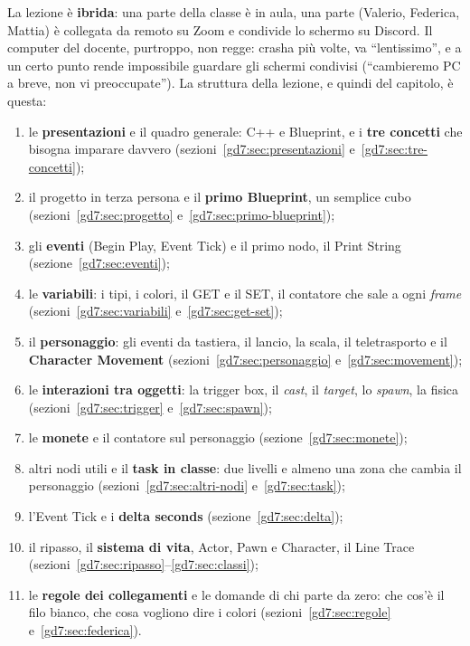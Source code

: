 La lezione è \textbf{ibrida}: una parte della classe è in aula, una parte
(Valerio, Federica, Mattia) è collegata da remoto su Zoom e condivide lo
schermo su Discord. Il computer del docente, purtroppo, non regge: crasha più
volte, va ``lentissimo'', e a un certo punto rende impossibile guardare gli
schermi condivisi (``cambieremo PC a breve, non vi preoccupate''). La
struttura della lezione, e quindi del capitolo, è questa:
\begin{enumerate}
  \item le \textbf{presentazioni} e il quadro generale: C++ e Blueprint, e i
        \textbf{tre concetti} che bisogna imparare davvero
        (sezioni~\ref{gd7:sec:presentazioni} e~\ref{gd7:sec:tre-concetti});
  \item il progetto in terza persona e il \textbf{primo Blueprint}, un
        semplice cubo (sezioni~\ref{gd7:sec:progetto}
        e~\ref{gd7:sec:primo-blueprint});
  \item gli \textbf{eventi} (Begin Play, Event Tick) e il primo nodo, il
        Print String (sezione~\ref{gd7:sec:eventi});
  \item le \textbf{variabili}: i tipi, i colori, il GET e il SET, il
        contatore che sale a ogni \emph{frame}
        (sezioni~\ref{gd7:sec:variabili} e~\ref{gd7:sec:get-set});
  \item il \textbf{personaggio}: gli eventi da tastiera, il lancio, la
        scala, il teletrasporto e il \textbf{Character Movement}
        (sezioni~\ref{gd7:sec:personaggio} e~\ref{gd7:sec:movement});
  \item le \textbf{interazioni tra oggetti}: la trigger box, il
        \emph{cast}, il \emph{target}, lo \emph{spawn}, la fisica
        (sezioni~\ref{gd7:sec:trigger} e~\ref{gd7:sec:spawn});
  \item le \textbf{monete} e il contatore sul personaggio
        (sezione~\ref{gd7:sec:monete});
  \item altri nodi utili e il \textbf{task in classe}: due livelli e almeno
        una zona che cambia il personaggio
        (sezioni~\ref{gd7:sec:altri-nodi} e~\ref{gd7:sec:task});
  \item l'Event Tick e i \textbf{delta seconds}
        (sezione~\ref{gd7:sec:delta});
  \item il ripasso, il \textbf{sistema di vita}, Actor, Pawn e Character, il
        Line Trace (sezioni~\ref{gd7:sec:ripasso}--\ref{gd7:sec:classi});
  \item le \textbf{regole dei collegamenti} e le domande di chi parte da
        zero: che cos'è il filo bianco, che cosa vogliono dire i colori
        (sezioni~\ref{gd7:sec:regole} e~\ref{gd7:sec:federica}).
\end{enumerate}

